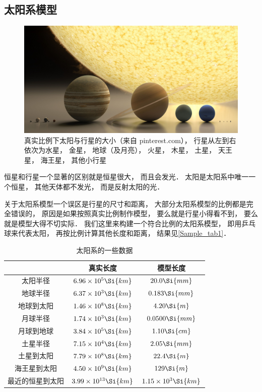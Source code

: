 
\subsection{太阳系模型}

\begin{figure}[ht]
\centering
\includegraphics[width=14cm]{./figures/Astro1.pdf}
\caption{真实比例下太阳与行星的大小（来自 pinterest.com）， 行星从左到右依次为水星， 金星， 地球（及月亮）， 火星， 木星， 土星， 天王星， 海王星， 其他小行星} \label{Astro_fig1}
\end{figure}

恒星和行星一个显著的区别就是恒星很大， 而且会发光． 太阳是太阳系中唯一一个恒星， 其他天体都不发光， 而是反射太阳的光．

关于太阳系模型一个误区是行星的尺寸和距离， 大部分太阳系模型的比例都是完全错误的， 原因是如果按照真实比例制作模型， 要么就是行星小得看不到， 要么就是模型大得不切实际． 我们这里来构建一个符合比例的太阳系模型， 即用乒乓球来代表太阳， 再按比例计算其他长度和距离， 结果见\autoref{Sample_tab1}．

\begin{table}[ht]
\centering
\caption{太阳系的一些数据}\label{Sample_tab1}
\begin{tabular}{|c|c|c|}
\hline
 & 真实长度 & 模型长度 \\
\hline
太阳半径 & $6.96\times 10^5 \Si{km}$ & $20.0 \Si{mm}$\\
\hline
地球半径 &  $6.37\times 10^3 \Si{km}$ & $0.183 \Si{mm}$\\
\hline
地球到太阳  &  $1.46 \times 10^8 \Si{km}$ & $4.20 \Si{m}$\\
\hline
月球半径 & $1.74 \times 10^3 \Si{km}$ & $0.0500 \Si{mm}$\\
\hline
月球到地球 & $3.84 \times 10^5 \Si{km}$ &  $1.10 \Si{cm}$\\
\hline
土星半径 & $7.15 \times 10^4 \Si{km}$ & $2.05 \Si{mm}$\\
\hline
土星到太阳 & $7.79 \times 10^8 \Si{km}$ & $22.4 \Si{m}$\\
\hline
海王星到太阳 & $4.50 \times 10^9 \Si{km}$ & $129 \Si{m}$\\
\hline
最近的恒星到太阳 & $3.99 \times 10^{13} \Si{km}$ &  $1.15 \times 10^3 \Si{km}$\\
\hline
\end{tabular}
\end{table}

